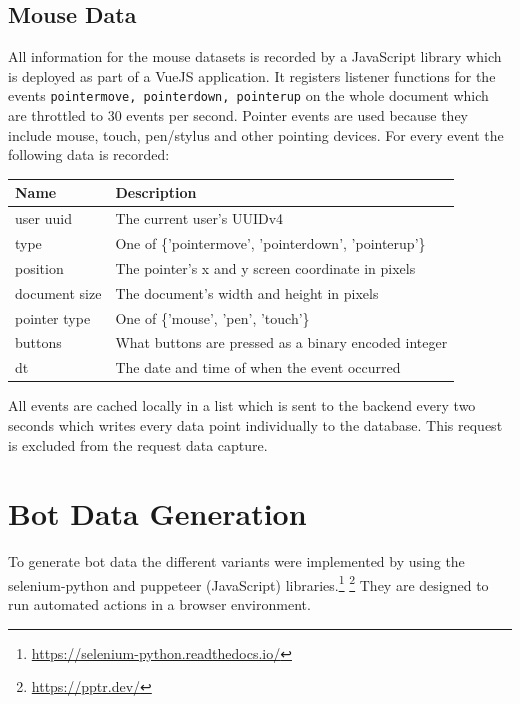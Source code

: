 \documentclass[
    fontsize=12pt,
    headings=small,
    parskip=half,           %
    bibliography=totoc,
    numbers=noenddot,       %
    open=any,               %
    final,                   %
    table
]{scrreprt}
\begin{document}
\subsection{Mouse Data}

All information for the mouse datasets is recorded by a JavaScript library which is deployed as part of a VueJS application. It registers listener functions for the events \lstinline{pointermove, pointerdown, pointerup} on the whole document which are throttled to $30$ events per second. Pointer events are used because they include mouse, touch, pen/stylus and other pointing devices. For every event the following data is recorded:

\begin{table}[H]
\begin{center}
\begin{tabular}{ll}
\toprule
Name & Description \\
\midrule
user uuid & The current user's UUIDv4 \\
type & One of \{'pointermove', 'pointerdown', 'pointerup'\} \\
position & The pointer's x and y screen coordinate in pixels \\
document size & The document's width and height in pixels \\
pointer type & One of \{'mouse', 'pen', 'touch'\} \\
buttons & What buttons are pressed as a binary encoded integer \\
dt & The date and time of when the event occurred \\
\bottomrule
\end{tabular}
\end{center}
\end{table}

All events are cached locally in a list which is sent to the backend every two seconds which writes every data point individually to the database. This request is excluded from the request data capture.

\section{Bot Data Generation}

To generate bot data the different variants were implemented by using the selenium-python and puppeteer (JavaScript) libraries.\footnote{\url{https://selenium-python.readthedocs.io/}} \footnote{\url{https://pptr.dev/}} They are designed to run automated actions in a browser environment.
\end{document}
